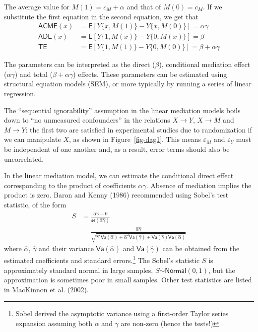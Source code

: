 \documentclass[
  11pt,
  letterpaper,
]{scrbook}
\theoremstyle{definition}
\theoremstyle{definition}
\theoremstyle{remark}
\begin{document}
The average value for \(M(1) = c_M + \alpha\) and that of \(M(0)=c_M\).
If we substitute the first equation in the second equation, we get that
\begin{align*}
\mathsf{ACME}(x) &= \mathsf{E}[Y\{x, M(1)\} -Y\{x, M(0)\}] = \alpha \gamma\\
\mathsf{ADE}(x) &= \mathsf{E}[Y\{1, M(x)\} -Y\{0, M(x)\}] = \beta \\
\mathsf{TE} &= \mathsf{E}[Y\{1, M(1)\} -Y\{0, M(0)\}] = \beta + \alpha \gamma
\end{align*}

The parameters can be interpreted as the direct (\(\beta\)), conditional
mediation effect (\(\alpha \gamma\)) and total
(\(\beta + \alpha \gamma\)) effects. These parameters can be estimated
using structural equation models (SEM), or more typically by running a
series of linear regression.

The ``sequential ignorability'' assumption in the linear mediation
models boils down to ``no unmeasured confounders'' in the relations
\(X \to Y\), \(X \to M\) and \(M \to Y\): the first two are satisfied in
experimental studies due to randomization if we can manipulate \(X\), as
shown in Figure~\ref{fig-dag1}. This means \(\varepsilon_M\) and
\(\varepsilon_Y\) must be independent of one another and, as a result,
error terms should also be uncorrelated.

In the linear mediation model, we can estimate the conditional direct
effect corresponding to the product of coefficients \(\alpha\gamma\).
Absence of mediation implies the product is zero. Baron and Kenny (1986)
recommended using Sobel's test statistic, of the form \begin{align*}
S  &= \frac{\widehat{\alpha}\widehat{\gamma} - 0}{\mathsf{se}(\widehat{\alpha}\widehat{\gamma})} \\&=  \frac{\widehat{\alpha}\widehat{\gamma}}{\sqrt{\widehat{\gamma}^2\mathsf{Va}(\widehat{\alpha}) + \widehat{\alpha}^2\mathsf{Va}(\widehat{\gamma}) + \mathsf{Va}(\widehat{\gamma})\mathsf{Va}(\widehat{\alpha})}}
\end{align*} where \(\widehat{\alpha}\), \(\widehat{\gamma}\) and their
variance \(\mathsf{Va}(\widehat{\alpha})\) and
\(\mathsf{Va}(\widehat{\gamma})\) can be obtained from the estimated
coefficients and standard errors.\footnote{Sobel derived the asymptotic
  variance using a first-order Taylor series expansion assuming both
  \(\alpha\) and \(\gamma\) are non-zero (hence the tests!)} The Sobel's
statistic \(S\) is approximately standard normal in large samples,
\(S \stackrel{\cdot}{\sim}\mathsf{Normal}(0,1)\), but the approximation
is sometimes poor in small samples. Other test statistics are listed in
MacKinnon et al. (2002).
\end{document}
